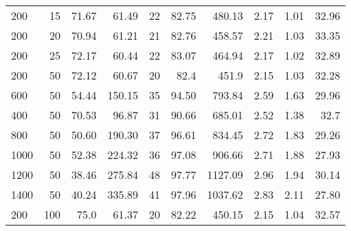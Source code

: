 \begin{table}[H]
{{\begin{tabular}{lrrrrrrrrr}
                200        & 15                   & 71.67             & 61.49           & 22       & 82.75          & 480.13                     & 2.17      & 1.01              & 32.96                    \\
                200        & 20                   & 70.94             & 61.21           & 21       & 82.76          & 458.57                     & 2.21      & 1.03              & 33.35                    \\
                200        & 25                   & 72.17             & 60.44           & 22       & 83.07          & 464.94                     & 2.17      & 1.02              & 32.89                    \\
                200        & 50                   & 72.12             & 60.67           & 20       & 82.4           & 451.9                      & 2.15      & 1.03              & 32.28                    \\
                600        & 50                   & 54.44             & 150.15          & 35       & 94.50          & 793.84                     & 2.59      & 1.63              & 29.96                    \\
                400        & 50                   & 70.53             & 96.87           & 31       & 90.66          & 685.01                     & 2.52      & 1.38              & 32.7                     \\
                800        & 50                   & 50.60             & 190.30          & 37       & 96.61          & 834.45                     & 2.72      & 1.83              & 29.26                    \\
                1000       & 50                   & 52.38             & 224.32          & 36       & 97.08          & 906.66                     & 2.71      & 1.88              & 27.93                    \\
                1200       & 50                   & 38.46             & 275.84          & 48       & 97.77          & 1127.09                    & 2.96      & 1.94              & 30.14                    \\
                1400       & 50                   & 40.24             & 335.89          & 41       & 97.96          & 1037.62                    & 2.83      & 2.11              & 27.80                    \\
                200        & 100                  & 75.0              & 61.37           & 20       & 82.22          & 450.15                     & 2.15      & 1.04              & 32.57                    \\

\end{tabular}}}
\end{table}
